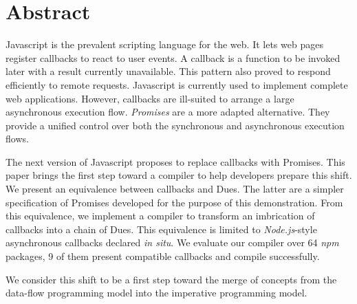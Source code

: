 \section*{Abstract}

Javascript is the prevalent scripting language for the web.
It lets web pages register callbacks to react to user events.
A callback is a function to be invoked later with a result currently unavailable.
This pattern also proved to respond efficiently to remote requests.
Javascript is currently used to implement complete web applications.
However, callbacks are ill-suited to arrange a large asynchronous execution flow.
\textit{Promises} are a more adapted alternative.
They provide a unified control over both the synchronous and asynchronous execution flows.

The next version of Javascript proposes to replace callbacks with Promises.
This paper brings the first step toward a compiler to help developers prepare this shift.
We present an equivalence between callbacks and Dues.
The latter are a simpler specification of Promises developed for the purpose of this demonstration.
From this equivalence, we implement a compiler to transform an imbrication of callbacks into a chain of Dues.
This equivalence is limited to \textit{Node.js}-style asynchronous callbacks declared \textit{in situ}.
We evaluate our compiler over 64 \textit{npm} packages, 9 of them present compatible callbacks and compile successfully.

We consider this shift to be a first step toward the merge of concepts from the data-flow programming model into the imperative programming model.

